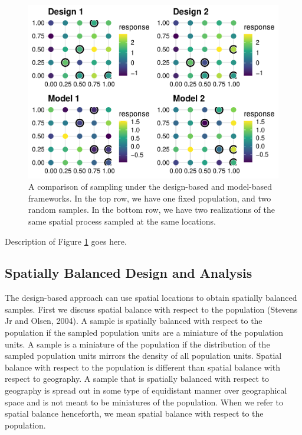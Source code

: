 \documentclass[]{elsarticle} %
\begin{document}
\begin{figure}
\includegraphics[width=1\linewidth]{SpatialDVM_Manuscript_files/figure-latex/fig1-1} \caption{A comparison of sampling under the design-based and model-based frameworks. In the top row, we have one fixed population, and two random samples. In the bottom row, we have two realizations of the same spatial process sampled at the same locations.}\label{fig:fig1}
\end{figure}

Description of Figure \ref{fig:fig1} goes here.

\hypertarget{spatially-balanced-design-and-analysis}{%
\subsection{Spatially Balanced Design and
Analysis}\label{spatially-balanced-design-and-analysis}}

The design-based approach can use spatial locations to obtain spatially
balanced samples. First we discuss spatial balance with respect to the
population (Stevens Jr and Olsen, 2004). A sample is spatially balanced
with respect to the population if the sampled population units are a
miniature of the population units. A sample is a miniature of the
population if the distribution of the sampled population units mirrors
the density of all population units. Spatial balance with respect to the
population is different than spatial balance with respect to geography.
A sample that is spatially balanced with respect to geography is spread
out in some type of equidistant manner over geographical space and is
not meant to be miniatures of the population. When we refer to spatial
balance henceforth, we mean spatial balance with respect to the
population.
\end{document}
